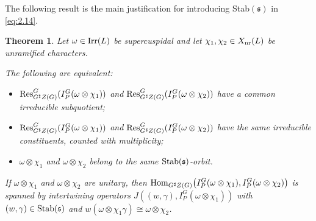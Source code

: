 \documentclass[11pt]{amsart}
\newtheorem{thm}{Theorem}[section]
\theoremstyle{definition}
\begin{document}
The following result is the main justification for introducing Stab$({{\mathfrak s}})$ in \eqref{eq:2.14}. 

\begin{thm}\label{thm:2.5}
Let $\omega \in {{\rm Irr}} (L)$ be supercuspidal and let $\chi_1,\chi_2 \in X_{{\rm nr}} (L)$ 
be unramified characters.
{\begin{enumerate} {{
\item The following are equivalent:
\begin{itemize}
\item[(i)] ${{\rm Res}}^G_{G^\sharp Z(G)} (I_P^G (\omega \otimes \chi_1))$ and 
${{\rm Res}}^G_{G^\sharp Z(G)} (I_P^G (\omega \otimes \chi_2))$ have a common irreducible subquotient;
\item[(ii)] ${{\rm Res}}^G_{G^\sharp Z(G)} (I_P^G (\omega \otimes \chi_1))$ and
${{\rm Res}}^G_{G^\sharp Z(G)} (I_P^G (\omega \otimes \chi_2))$ have the same irreducible constituents,
counted with multiplicity;
\item[(iii)] $\omega \otimes \chi_1$ and $\omega \otimes \chi_2$ 
belong to the same ${{\rm Stab}}({{\mathfrak s}})$-orbit. 
\end{itemize}
\item If $\omega \otimes \chi_1$ and $\omega \otimes \chi_2$ are unitary, then 
${{\rm Hom}}_{G^\sharp Z(G)}\big( I_P^G (\omega \otimes \chi_1), I_P^G (\omega \otimes \chi_2) \big)$ 
is spanned by intertwining operators $J((w,\gamma), I_P^G (\omega \otimes \chi_1))$ with 
$(w,\gamma) \in {{\rm Stab}} ({{\mathfrak s}})$ and $w (\omega \otimes \chi_1 \gamma) \cong \omega \otimes \chi_2$.
}} \end{enumerate}}
\end{thm}
\end{document}
